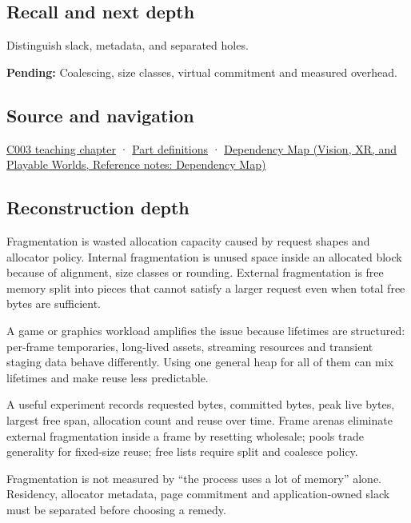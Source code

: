 \subsection{Recall and next depth}\label{appendix-a7c50686d81f-recall-and-next-depth}

Distinguish slack, metadata, and separated holes.

\textbf{Pending:} Coalescing, size classes, virtual commitment and measured overhead.

\subsection{Source and navigation}\label{appendix-a7c50686d81f-source-and-navigation}

\hyperref[01-foundations-i-ch002-where-the-bytes-live]{C003 teaching chapter} · \hyperref[appendix-fd090d982a15-m003---parts-41-60]{Part definitions} · \href{../07-Vision-XR-and-Playable-Worlds/main.pdf\#nameddest=appendix-4ad47bdd269a}{Dependency Map (Vision, XR, and Playable Worlds, Reference notes: Dependency Map)}

\subsection{Reconstruction depth}\label{appendix-a7c50686d81f-reconstruction-depth}

Fragmentation is wasted allocation capacity caused by request shapes and allocator policy. Internal fragmentation is unused space inside an allocated block because of alignment, size classes or rounding. External fragmentation is free memory split into pieces that cannot satisfy a larger request even when total free bytes are sufficient.

A game or graphics workload amplifies the issue because lifetimes are structured: per-frame temporaries, long-lived assets, streaming resources and transient staging data behave differently. Using one general heap for all of them can mix lifetimes and make reuse less predictable.

A useful experiment records requested bytes, committed bytes, peak live bytes, largest free span, allocation count and reuse over time. Frame arenas eliminate external fragmentation inside a frame by resetting wholesale; pools trade generality for fixed-size reuse; free lists require split and coalesce policy.

Fragmentation is not measured by ``the process uses a lot of memory'' alone. Residency, allocator metadata, page commitment and application-owned slack must be separated before choosing a remedy.

